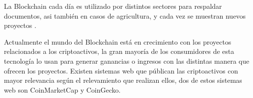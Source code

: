 




 La Blockchain  cada día es utilizado por distintos sectores para respaldar 
documentos, asi también en casos de agricultura, y cada vez se muestran nuevos proyectos \cite[]{Blockchain_federal_argentina_trazabilidad_nodate}. 

Actualmente el mundo del  Blockchain está en crecimiento con los proyectos relacionados a los 
criptoactivos, la gran mayoría de los consumidores de esta tecnología lo usan para generar 
ganancias o ingresos con las distintas manera que  ofrecen los proyectos.
Existen sistemas web que públican las criptoactivos con mayor relevancia según el relevamiento que realizan ellos, 
dos de estos sistemas web son CoinMarketCap y CoinGecko.


